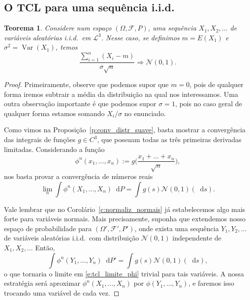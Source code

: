 \documentclass[reqno, draft]{book}
\newcommand*\1{\mathds{1}}
\newtheorem{theorem}{Teorema}[section]
\DeclareMathOperator{\Var}{Var}
\def \iid{i.i.d.~}
\renewcommand*\d{\mathop{}\!\mathrm{d}}
\begin{document}
\subsection{O TCL para uma sequência i.i.d.}

\begin{theorem}
  \label{:tcl_iid}
  Considere num espaço $(\Omega, \mathcal{F}, P)$, uma sequência $X_1, X_2, \dots$ de variáveis aleatórias \iid em $\mathcal{L}^3$.
  Nesse caso, se definimos $m = E(X_1)$ e $\sigma^2 = \Var(X_1)$, temos
  \begin{equation}
    \frac{\sum_{i=1}^n (X_i - m)}{\sigma \sqrt{n}} \Rightarrow \mathcal{N}(0,1).
  \end{equation}
\end{theorem}

\begin{proof}
  Primeiramente, observe que podemos supor que $m = 0$, pois de qualquer forma iremos subtrair a média da distribuição na qual nos interessamos.
  Uma outra observação importante é que podemos supor $\sigma = 1$, pois no caso geral de qualquer forma estamos somando $X_i/\sigma$ no enunciado.

  Como vimos na Proposição~\ref{p:conv_distr_suave}, basta mostrar a convergência das integrais de funções $g \in C^3$, que possuam todas as três primeiras derivadas limitadas.
  Considerando a função
  \begin{equation}
    \phi^n(x_1, \dots, x_n) := g\Big(\frac{x_1 + \dots + x_n}{\sqrt{n}} \Big),
  \end{equation}
  nos basta provar a convergência de números reais
  \begin{equation}
    \label{e:tcl_limite_phi}
    \lim_n \int \phi^n(X_1, \dots, X_n) \d P = \int g(s) \mathcal{N}(0,1)(\d s).
  \end{equation}

  Vale lembrar que no Corolário~\ref{c:normaliz_normais} já estabelecemos algo mais forte para variáveis normais.
  Mais precisamente, suponha que extendemos nosso espaço de probabilidade para $(\Omega', \mathcal{F}', P')$, onde exista uma sequência $Y_1, Y_2, \dots$ de variáveis aleatórias \iid com distribuição $\mathcal{N}(0,1)$ independente de $X_1, X_2, \dots$
  Então,
  \begin{equation}
    \int \phi^n(Y_1, \dots, Y_n) \d P' = \int g(s) \mathcal{N}(0,1) (\d s),
  \end{equation}
  o que tornaria o limite em \eqref{e:tcl_limite_phi} trivial para tais variáveis.
  A nossa estratégia será aproximar $\phi^n(X_1, \dots, X_n)$ por $\phi(Y_1, \dots, Y_n)$, e faremos isso trocando uma variável de cada vez.


\end{proof}
\end{document}

